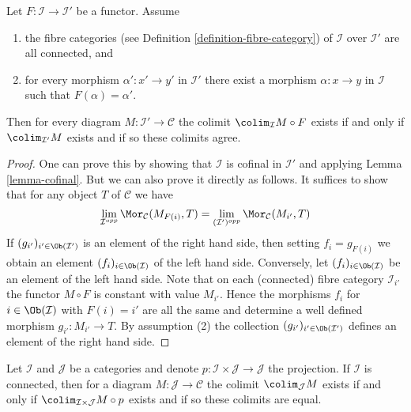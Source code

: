 \begin{lemma}
\label{lemma-colimit-constant-connected-fibers}
Let $F : \mathcal{I} \to \mathcal{I}'$ be a functor.
Assume
\begin{enumerate}
\item the fibre categories (see
Definition \ref{definition-fibre-category})
of $\mathcal{I}$ over $\mathcal{I}'$ are all connected, and
\item for every morphism $\alpha' : x' \to y'$ in $\mathcal{I}'$ there
exist a morphism $\alpha : x \to y$ in $\mathcal{I}$ such that
$F(\alpha) = \alpha'$.
\end{enumerate}
Then for every diagram $M : \mathcal{I}' \to \mathcal{C}$
the colimit $\colim_\mathcal{I} M \circ F$ exists if and only
if $\colim_{\mathcal{I}'} M$ exists and if so these colimits
agree.
\end{lemma}

\begin{proof}
One can prove this by showing that $\mathcal{I}$ is cofinal in
$\mathcal{I}'$ and applying Lemma \ref{lemma-cofinal}.
But we can also prove it directly as follows.
It suffices to show that for any object $T$ of $\mathcal{C}$ we have
$$
\lim_{\mathcal{I}^{opp}} \Mor_\mathcal{C}(M_{F(i)}, T)
=
\lim_{(\mathcal{I}')^{opp}} \Mor_\mathcal{C}(M_{i'}, T)
$$
If $(g_{i'})_{i' \in \Ob(\mathcal{I}')}$ is an element of
the right hand side, then setting $f_i = g_{F(i)}$ we obtain an
element $(f_i)_{i \in \Ob(\mathcal{I})}$ of the left hand side.
Conversely, let $(f_i)_{i \in \Ob(\mathcal{I})}$ be an element of the
left hand side. Note that on each (connected)
fibre category $\mathcal{I}_{i'}$ the functor $M \circ F$
is constant with value $M_{i'}$. Hence the morphisms
$f_i$ for $i \in \Ob(\mathcal{I})$ with $F(i) = i'$
are all the same and determine a well defined morphism
$g_{i'} : M_{i'} \to T$. By assumption (2) the collection
$(g_{i'})_{i' \in \Ob(\mathcal{I}')}$ defines an element
of the right hand side.
\end{proof}

\begin{lemma}
\label{lemma-product-with-connected}
Let $\mathcal{I}$ and $\mathcal{J}$ be a categories and denote
$p : \mathcal{I} \times \mathcal{J} \to \mathcal{J}$ the projection.
If $\mathcal{I}$ is connected, then for a diagram
$M : \mathcal{J} \to \mathcal{C}$ the colimit $\colim_\mathcal{J} M$ exists
if and only if $\colim_{\mathcal{I} \times \mathcal{J}} M \circ p$ exists and
if so these colimits are equal.
\end{lemma}


